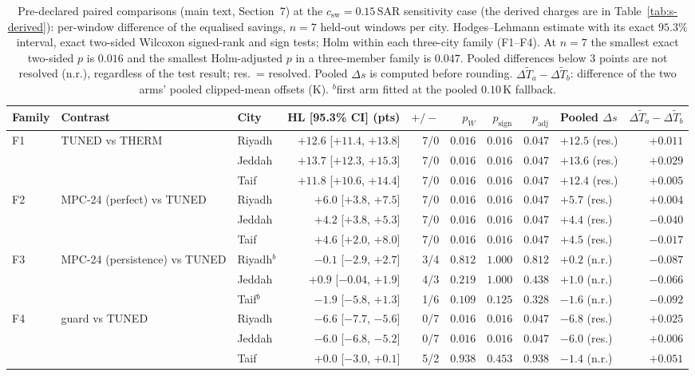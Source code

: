 \documentclass[11pt]{article}
\newcommand{\csw}{c_{\mathrm{sw}}}
\newcommand{\SAR}{\text{SAR}}
\begin{document}
\begin{table}[!ht]
\centering
\caption{Pre-declared paired comparisons (main text, Section~7) at the $\csw=0.15\,\SAR$ sensitivity case (the derived charges are in Table~\ref{tab:s-derived}): per-window difference of the equalised savings, $n=7$ held-out windows per city. Hodges--Lehmann estimate with its exact $95.3\%$ interval, exact two-sided Wilcoxon signed-rank and sign tests; Holm within each three-city family (F1--F4). At $n=7$ the smallest exact two-sided $p$ is $0.016$ and the smallest Holm-adjusted $p$ in a three-member family is $0.047$. Pooled differences below $3$ points are not resolved (n.r.), regardless of the test result; res.\ = resolved. Pooled $\Delta s$ is computed before rounding. $\Delta\tilde T_a-\Delta\tilde T_b$: difference of the two arms' pooled clipped-mean offsets (K). $^{b}$first arm fitted at the pooled $0.10\,$K fallback.}
\label{tab:s-stats}
\footnotesize\setlength{\tabcolsep}{3pt}
\begin{tabularx}{\textwidth}{@{}l>{\raggedright\arraybackslash}Xlrrrrrlr@{}}
\toprule
Family & Contrast & City & HL [95.3\% CI] (pts) & $+/-$ & $p_W$ & $p_{\mathrm{sign}}$ & $p_{\mathrm{adj}}$ & Pooled $\Delta s$ & $\Delta\tilde T_a-\Delta\tilde T_b$ \\
\midrule
F1 & TUNED vs THERM & Riyadh & $+12.6$ [$+11.4$, $+13.8$] & 7/0 & $0.016$ & $0.016$ & $0.047$ & $+12.5$ (res.) & $+0.011$ \\
 &  & Jeddah & $+13.7$ [$+12.3$, $+15.3$] & 7/0 & $0.016$ & $0.016$ & $0.047$ & $+13.6$ (res.) & $+0.029$ \\
 &  & Taif & $+11.8$ [$+10.6$, $+14.4$] & 7/0 & $0.016$ & $0.016$ & $0.047$ & $+12.4$ (res.) & $+0.005$ \\
F2 & MPC-24 (perfect) vs TUNED & Riyadh & $+6.0$ [$+3.8$, $+7.5$] & 7/0 & $0.016$ & $0.016$ & $0.047$ & $+5.7$ (res.) & $+0.004$ \\
 &  & Jeddah & $+4.2$ [$+3.8$, $+5.3$] & 7/0 & $0.016$ & $0.016$ & $0.047$ & $+4.4$ (res.) & $-0.040$ \\
 &  & Taif & $+4.6$ [$+2.0$, $+8.0$] & 7/0 & $0.016$ & $0.016$ & $0.047$ & $+4.5$ (res.) & $-0.017$ \\
F3 & MPC-24 (persistence) vs TUNED & Riyadh$^{b}$ & $-0.1$ [$-2.9$, $+2.7$] & 3/4 & $0.812$ & $1.000$ & $0.812$ & $+0.2$ (n.r.) & $-0.087$ \\
 &  & Jeddah & $+0.9$ [$-0.04$, $+1.9$] & 4/3 & $0.219$ & $1.000$ & $0.438$ & $+1.0$ (n.r.) & $-0.066$ \\
 &  & Taif$^{b}$ & $-1.9$ [$-5.8$, $+1.3$] & 1/6 & $0.109$ & $0.125$ & $0.328$ & $-1.6$ (n.r.) & $-0.092$ \\
F4 & guard vs TUNED & Riyadh & $-6.6$ [$-7.7$, $-5.6$] & 0/7 & $0.016$ & $0.016$ & $0.047$ & $-6.8$ (res.) & $+0.025$ \\
 &  & Jeddah & $-6.0$ [$-6.8$, $-5.2$] & 0/7 & $0.016$ & $0.016$ & $0.047$ & $-6.0$ (res.) & $+0.006$ \\
 &  & Taif & $+0.0$ [$-3.0$, $+0.1$] & 5/2 & $0.938$ & $0.453$ & $0.938$ & $-1.4$ (n.r.) & $+0.051$ \\
\bottomrule
\end{tabularx}
\end{table}
\end{document}
